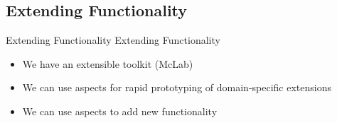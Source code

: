 

\subsection*{Extending Functionality}
\begin{frame}{Extending Functionality}
  Extending Functionality
  \begin{itemize}
  \item We have an extensible toolkit (McLab)
  \item We can use aspects for rapid prototyping of domain-specific extensions
  \item We can use aspects to add new functionality %
  \end{itemize}
\end{frame}

